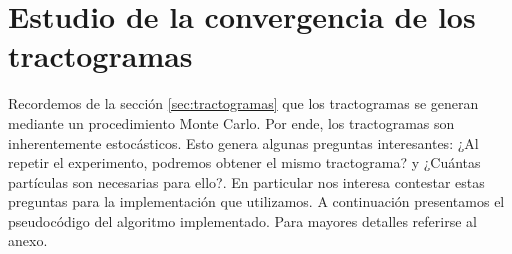 \section{Estudio de la convergencia de los tractogramas}
\label{sec:convergencia}

Recordemos de la secci\'on \ref{sec:tractogramas} que los tractogramas se generan
mediante un procedimiento Monte Carlo. Por ende, los tractogramas son inherentemente
estoc\'asticos. Esto genera algunas preguntas interesantes: ¿Al repetir
el experimento, podremos obtener el mismo tractograma? y ¿Cu\'antas part\'iculas
son necesarias para ello?. En particular nos interesa contestar estas preguntas
para la implementaci\'on que utilizamos. A continuaci\'on presentamos el 
pseudoc\'odigo del algoritmo implementado. Para mayores detalles referirse 
al anexo. \\


\settowidth{}
\addtolength\mylen{\parindent}


